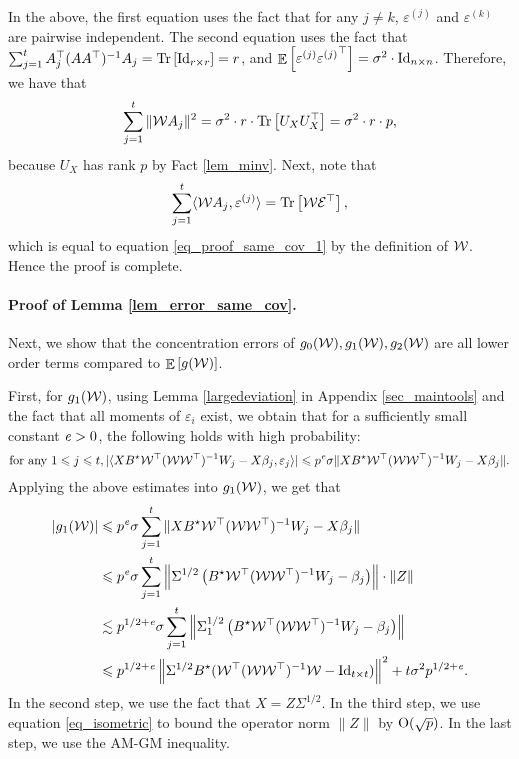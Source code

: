 	In the above, the first equation uses the fact that for any $j\neq k$, $\varepsilon^{(j)}$ and $\varepsilon^{(k)}$ are pairwise independent.
	The second equation uses the fact that $\sum_{j=1}^t A_j^{\top} (AA^{\top})^{-1} A_j = \operatorname{Tr}\left[\operatorname{Id}_{r\times r}\right] = r$, and $\mathop{\mathbb{E}}\left[ \varepsilon^{(j)} {\varepsilon^{(j)}}^{\top} \right] = \sigma^2 \cdot \operatorname{Id}_{n\times n}$.
	Therefore, we have that
	\begin{align*}
		\sum_{j=1}^t \|{\mathcal W} A_j\|^2 = \sigma^2 \cdot r \cdot \operatorname{Tr}\left[U_X U_X^{\top}\right] = \sigma^2 \cdot r \cdot p,
	\end{align*}
	because $U_X$ has rank $p$ by Fact \ref{lem_minv}.
	Next, note that
	\[ \sum_{j=1}^t \langle {\mathcal W} A_j, \varepsilon^{(j)} \rangle = \operatorname{Tr}\left[{\mathcal W} \mathcal{E}^{\top}\right], \]
	which is equal to equation \eqref{eq_proof_same_cov_1} by the definition of ${\mathcal W}$. Hence the proof is complete.

	\paragraph{Proof of Lemma \ref{lem_error_same_cov}.} Next, we show that the concentration errors of $g_0({\mathcal W}), g_1({\mathcal W}), g_2({\mathcal W})$ are all lower order terms compared to $\mathop{\mathbb{E}}\left[ g({\mathcal W}) \right]$.

	First, for $g_1({\mathcal W})$, using Lemma \ref{largedeviation} in Appendix \ref{sec_maintools} and the fact that all moments of $\varepsilon_i$ exist, we obtain that for a sufficiently small constant ${\mathit{e}}>0$, the following holds with high probability:
	\[ \text{for any } 1\leqslant j \leqslant t, |\langle XB^{\star} {\mathcal W}^{\top} ({\mathcal W}{\mathcal W}^{\top})^{-1}W_j - X\beta_j, \varepsilon_j \rangle| \leqslant p^{\mathit{e}} \sigma\|XB^{\star} {\mathcal W}^{\top} ({\mathcal W}{\mathcal W}^{\top})^{-1}W_j - X\beta_j\|. \]
	Applying the above estimates into $g_1({\mathcal W})$, we get that
	\begin{align}
	  \left\lvert g_1(\mathcal W)\right\rvert    &\leqslant p^{\mathit{e}} \sigma \sum_{j=1}^t \|  {XB^{\star} {\mathcal W}^{\top} ({\mathcal W}{\mathcal W}^{\top})^{-1}W_j - X\beta_j}\| \nonumber \\
	&\leqslant  p^{\mathit{e}} \sigma \sum_{j=1}^t \left\|   \Sigma^{1/2}\left(B^{\star} {\mathcal W}^{\top} ({\mathcal W}{\mathcal W}^{\top})^{-1}W_j - \beta_j\right) \right\| \cdot \|Z\| \nonumber\\
	&\lesssim p^{1/2+{\mathit{e}}} \sigma \sum_{j=1}^t \left\|   \Sigma_1^{1/2}\left(B^{\star} {\mathcal W}^{\top} ({\mathcal W}{\mathcal W}^{\top})^{-1}W_j - \beta_j\right) \right\| \nonumber\\
	& \leqslant p^{1/2+{\mathit{e}}} \left\| \Sigma^{1/2} B^{\star} ({\mathcal W}^{\top} ({\mathcal W} {\mathcal W}^{\top})^{-1} {\mathcal W} - \operatorname{Id}_{t\times t}) \right\|^2 + t\sigma^2 p^{1/2+{\mathit{e}}}.  \label{eq_est_g1}
	\end{align}
	In the second step, we use the fact that $X=Z\Sigma^{1/2}$.
	In the third step, we use equation \eqref{eq_isometric} to bound the operator norm $\|Z\|$ by $\operatorname{O}(\sqrt{p})$.
	In the last step, we use the AM-GM inequality.

